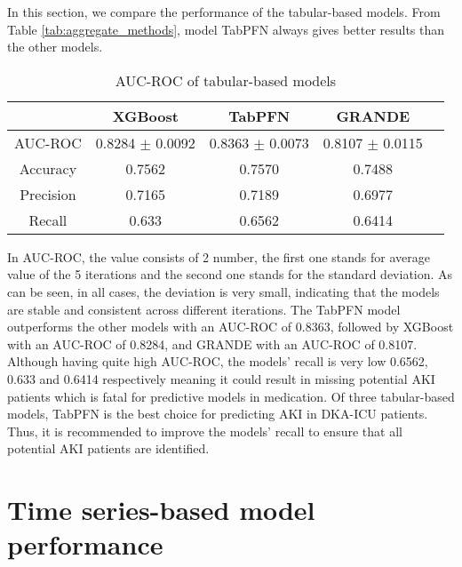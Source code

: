 \documentclass[../main.tex]{subfiles}
\begin{document}
In this section, we compare the performance of the tabular-based models. 
From Table \ref{tab:aggregate_methods}, model TabPFN always gives better results than the other models.

\begin{table}[H]
    \centering
    \caption{AUC-ROC of tabular-based models}
    \label{tab:tabular_models}
    \begin{tabular}{|c|c|c|c|c|}
        \hline
        \textbf{} & 
        \textbf{XGBoost} & 
        \textbf{TabPFN} & 
        \textbf{GRANDE} \\
        \hline

        AUC-ROC & 
        0.8284 $\pm$ 0.0092 & 
        0.8363 $\pm$ 0.0073& 
        0.8107 $\pm$ 0.0115 \\

        Accuracy &
        0.7562 &
        0.7570 &
        0.7488 \\

        Precision &
        0.7165 &
        0.7189 &
        0.6977 \\

        Recall &
        0.633 &
        0.6562 &
        0.6414 \\

        \hline
    \end{tabular}
\end{table}

In AUC-ROC, the value consists of 2 number, the first one stands for average value of the 5 iterations and the second one stands for the standard deviation.
As can be seen, in all cases, the deviation is very small, indicating that the models are stable and consistent across different iterations.
The TabPFN model outperforms the other models with an AUC-ROC of 0.8363, followed by XGBoost with an AUC-ROC of 0.8284, and GRANDE with an AUC-ROC of 0.8107.
Although having quite high AUC-ROC, the models' recall is very low 0.6562, 0.633 and 0.6414 respectively meaning it could result in missing potential AKI patients which is fatal for predictive models in medication.
Of three tabular-based models, TabPFN is the best choice for predicting AKI in DKA-ICU patients. 
Thus, it is recommended to improve the models' recall to ensure that all potential AKI patients are identified.


\section{Time series-based model performance}
\end{document}

